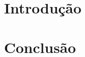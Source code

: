 \documentclass[12pt, a4paper]{article}
\begin{document}
\capa%

\section{Introdução}\label{sec:intro}
\section{Conclusão}\label{sec:concl}

%
\end{document}
